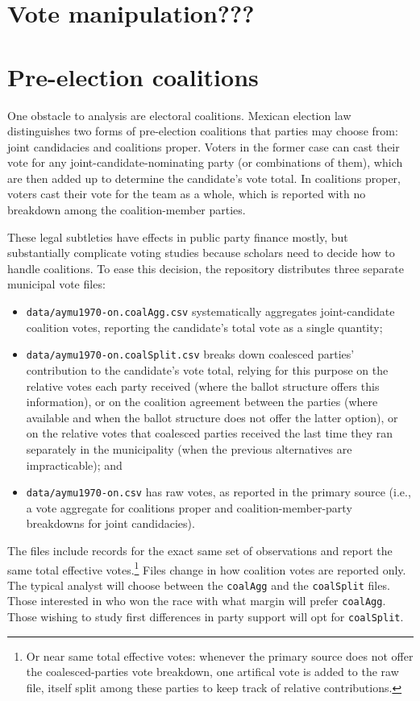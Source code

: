 \documentclass[letter,12pt]{article}
\begin{document}
\section{Vote manipulation???}

\citep{cantuContiguas2014ajps}

\section{Pre-election coalitions}\label{S:coalitions}

One obstacle to analysis are electoral coalitions. Mexican election law distinguishes two forms of pre-election coalitions that parties may choose from: joint candidacies and coalitions proper. Voters in the former case can cast their vote for any joint-candidate-nominating party (or combinations of them), which are then added up to determine the candidate's vote total. In coalitions proper, voters cast their vote for the team as a whole, which is reported with no breakdown among the coalition-member parties.

These legal subtleties have effects in public party finance mostly, but substantially complicate voting studies because scholars need to decide how to handle coalitions. To ease this decision, the repository distributes three separate municipal vote files: 

\begin{itemize}
\item \verb|data/aymu1970-on.coalAgg.csv| systematically aggregates joint-candidate coalition votes, reporting the candidate's total vote as a single quantity;
\item \verb|data/aymu1970-on.coalSplit.csv| breaks down coalesced parties' contribution to the candidate's vote total, relying for this purpose on the relative votes each party received (where the ballot structure offers this information), or on the coalition agreement between the parties (where available and when the ballot structure does not offer the latter option), or on the relative votes that coalesced parties received the last time they ran separately in the municipality (when the previous alternatives are impracticable); and
\item \verb|data/aymu1970-on.csv| has raw votes, as reported in the primary source (i.e., a vote aggregate for coalitions proper and coalition-member-party breakdowns for joint candidacies).
\end{itemize}

\noindent The files include records for the exact same set of observations and report the same total effective votes.\footnote{Or near same total effective votes: whenever the primary source does not offer the coalesced-parties vote breakdown, one artifical vote is added to the raw file, itself split among these parties to keep track of relative contributions.} Files change in how coalition votes are reported only. The typical analyst will choose between the \verb|coalAgg| and the \verb|coalSplit| files. Those interested in who won the race with what margin will prefer \verb|coalAgg|. Those wishing to study first differences in party support will opt for \verb|coalSplit|.
\end{document}
